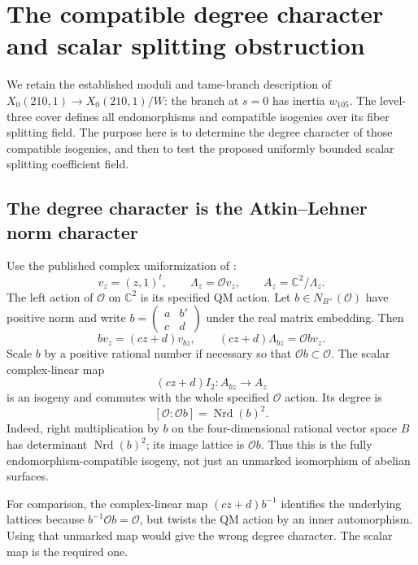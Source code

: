 \section{The compatible degree character and scalar splitting obstruction}

We retain the established moduli and tame-branch description of
$X_0(210,1)\to X_0(210,1)/W$: the branch at $s=0$ has inertia
$w_{105}$. The level-three cover defines all endomorphisms and compatible
isogenies over its fiber splitting field. The purpose here is to determine
the degree character of those compatible isogenies, and then to test the
proposed uniformly bounded scalar splitting coefficient field.

\subsection{The degree character is the Atkin--Lehner norm character}
Use the published complex uniformization of \cite[Chapter 43,
equations (43.1.2)--(43.1.3), Main Theorem 43.6.14]{Voight2021}:
\[
 v_z=(z,1)^t,\qquad\Lambda_z=\mathcal O v_z,\qquad
 A_z=\mathbb C^2/\Lambda_z.
\]
The left action of $\mathcal O$ on $\mathbb C^2$ is its specified QM
action. Let $b\in N_{B^\times}(\mathcal O)$ have positive norm and
write $b=\left(\begin{smallmatrix}a&b'\\c&d\end{smallmatrix}\right)$
under the real matrix embedding. Then
\[
 b v_z=(cz+d)v_{bz},\qquad
 (cz+d)\Lambda_{bz}=\mathcal O b v_z.
\]
Scale $b$ by a positive rational number if necessary so that
$\mathcal O b\subset\mathcal O$. The scalar complex-linear map
\[
 (cz+d)I_2:A_{bz}\longrightarrow A_z
\]
is an isogeny and commutes with the whole specified $\mathcal O$ action.
Its degree is
\[
 [\mathcal O:\mathcal O b]=\operatorname{Nrd}(b)^2.
\]
Indeed, right multiplication by $b$ on the four-dimensional rational
vector space $B$ has determinant $\operatorname{Nrd}(b)^2$; its image
lattice is $\mathcal O b$. Thus this is the fully endomorphism-compatible
isogeny, not just an unmarked isomorphism of abelian surfaces.

For comparison, the complex-linear map $(cz+d)b^{-1}$ identifies the
underlying lattices because $b^{-1}\mathcal O b=\mathcal O$, but twists
the QM action by an inner automorphism. Using that unmarked map would
give the wrong degree character. The scalar map is the required one.

